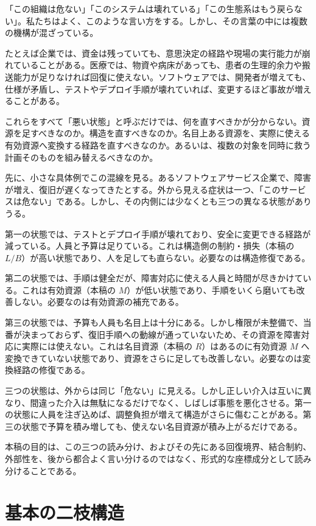 \documentclass[12pt,a4paper]{article}
\begin{document}
「この組織は危ない」「このシステムは壊れている」「この生態系はもう戻らない」。私たちはよく、このような言い方をする。しかし、その言葉の中には複数の機構が混ざっている。

たとえば企業では、資金は残っていても、意思決定の経路や現場の実行能力が崩れていることがある。医療では、物資や病床があっても、患者の生理的余力や搬送能力が足りなければ回復に使えない。ソフトウェアでは、開発者が増えても、仕様が矛盾し、テストやデプロイ手順が壊れていれば、変更するほど事故が増えることがある。

これらをすべて「悪い状態」と呼ぶだけでは、何を直すべきかが分からない。資源を足すべきなのか。構造を直すべきなのか。名目上ある資源を、実際に使える有効資源へ変換する経路を直すべきなのか。あるいは、複数の対象を同時に救う計画そのものを組み替えるべきなのか。

先に、小さな具体例でこの混線を見る。あるソフトウェアサービス企業で、障害が増え、復旧が遅くなってきたとする。外から見える症状は一つ、「このサービスは危ない」である。しかし、その内側には少なくとも三つの異なる状態がありうる。

第一の状態では、テストとデプロイ手順が壊れており、安全に変更できる経路が減っている。人員と予算は足りている。これは構造側の制約・損失（本稿の \(L/B\)）が高い状態であり、人を足しても直らない。必要なのは構造修復である。

第二の状態では、手順は健全だが、障害対応に使える人員と時間が尽きかけている。これは有効資源（本稿の \(M\)）が低い状態であり、手順をいくら磨いても改善しない。必要なのは有効資源の補充である。

第三の状態では、予算も人員も名目上は十分にある。しかし権限が未整備で、当番が決まっておらず、復旧手順への動線が通っていないため、その資源を障害対応に実際には使えない。これは名目資源（本稿の \(R\)）はあるのに有効資源 \(M\) へ変換できていない状態であり、資源をさらに足しても改善しない。必要なのは変換経路の修復である。

三つの状態は、外からは同じ「危ない」に見える。しかし正しい介入は互いに異なり、間違った介入は無駄になるだけでなく、しばしば事態を悪化させる。第一の状態に人員を注ぎ込めば、調整負担が増えて構造がさらに傷むことがある。第三の状態で予算を積み増しても、使えない名目資源が積み上がるだけである。

本稿の目的は、この三つの読み分け、およびその先にある回復境界、結合制約、外部性を、後から都合よく言い分けるのではなく、形式的な座標成分として読み分けることである。

\section{基本の二枝構造}\label{ux57faux672cux306eux4e8cux679dux69cbux9020}
\end{document}

